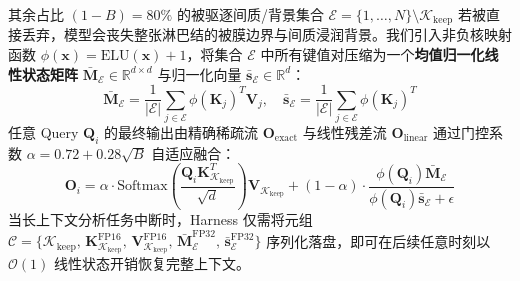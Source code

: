 \documentclass[10pt,twocolumn,a4paper]{ctexart}
\begin{document}
其余占比 $(1-B) = 80\%$ 的被驱逐间质/背景集合 $\mathcal{E} = \{1,\dots,N\} \setminus \mathcal{K}_{\text{keep}}$ 若被直接丢弃，模型会丧失整张淋巴结的被膜边界与间质浸润背景。我们引入非负核映射函数 $\phi(\mathbf{x}) = \text{ELU}(\mathbf{x}) + 1$，将集合 $\mathcal{E}$ 中所有键值对压缩为一个\textbf{均值归一化线性状态矩阵} $\bar{\mathbf{M}}_{\mathcal{E}} \in \mathbb{R}^{d \times d}$ 与归一化向量 $\bar{\mathbf{s}}_{\mathcal{E}} \in \mathbb{R}^d$：
\begin{equation}
    \bar{\mathbf{M}}_{\mathcal{E}} = \frac{1}{|\mathcal{E}|} \sum_{j \in \mathcal{E}} \phi(\mathbf{K}_j)^T \mathbf{V}_j, \quad
    \bar{\mathbf{s}}_{\mathcal{E}} = \frac{1}{|\mathcal{E}|} \sum_{j \in \mathcal{E}} \phi(\mathbf{K}_j)^T
    \label{eq:linear_state}
\end{equation}
任意 Query $\mathbf{Q}_i$ 的最终输出由精确稀疏流 $\mathbf{O}_{\text{exact}}$ 与线性残差流 $\mathbf{O}_{\text{linear}}$ 通过门控系数 $\alpha = 0.72 + 0.28\sqrt{B}$ 自适应融合：
\begin{equation}
    \mathbf{O}_i = \alpha \cdot \text{Softmax}\!\left(\frac{\mathbf{Q}_i \mathbf{K}_{\mathcal{K}_{\text{keep}}}^T}{\sqrt{d}}\right)\!\mathbf{V}_{\mathcal{K}_{\text{keep}}} + (1-\alpha) \cdot \frac{\phi(\mathbf{Q}_i) \bar{\mathbf{M}}_{\mathcal{E}}}{\phi(\mathbf{Q}_i)\bar{\mathbf{s}}_{\mathcal{E}} + \epsilon}
\end{equation}
当长上下文分析任务中断时，Harness 仅需将元组 $\mathcal{C} = \{\mathcal{K}_{\text{keep}},\, \mathbf{K}_{\mathcal{K}_{\text{keep}}}^{\text{FP16}},\, \mathbf{V}_{\mathcal{K}_{\text{keep}}}^{\text{FP16}},\, \bar{\mathbf{M}}_{\mathcal{E}}^{\text{FP32}},\, \bar{\mathbf{s}}_{\mathcal{E}}^{\text{FP32}}\}$ 序列化落盘，即可在后续任意时刻以 $\mathcal{O}(1)$ 线性状态开销恢复完整上下文。
\end{document}
